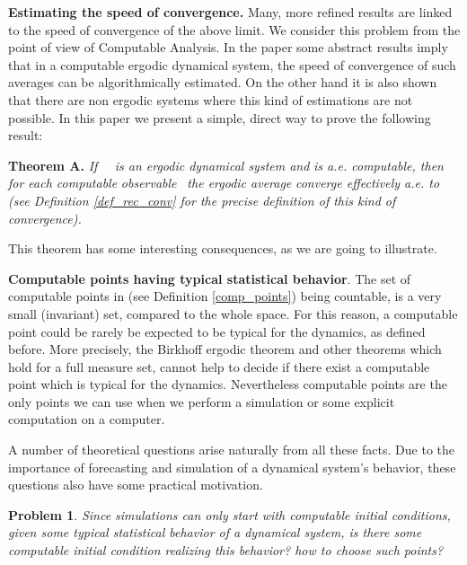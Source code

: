\documentclass[copyright,creativecommons]{eptcs}
\newtheorem{problem}{Problem}
\numberwithin{equation}{section}
\begin{document}
\noindent \textbf{Estimating the speed of convergence. }Many, more refined
results are linked to the speed of convergence of the above limit. We
consider this problem from the point of view of Computable Analysis. In the
paper \cite{AvigadGT10} some abstract results imply that in a computable
ergodic dynamical system, the speed of convergence of such averages can be
algorithmically estimated. On the other hand it is also shown that there are
non ergodic systems where this kind of estimations are not possible. In this
paper we present a simple, direct way to prove the following result:

\smallskip

\noindent \textbf{Theorem A. } \emph{If \ }\emph{\ is an ergodic
dynamical system and } \emph{is a.e. computable, then for each computable } \emph{observable }\emph{\ the ergodic average } \emph{converge effectively a.e. to } \emph{(see Definition \ref{def_rec_conv} for the precise
definition of this kind of convergence).} \newline

This theorem has some interesting consequences, as we are going to
illustrate.

\smallskip

\noindent \textbf{Computable points having typical statistical behavior}.
The set of computable points in  (see Definition \ref{comp_points}) being
countable, is a very small (invariant) set, compared to the whole space. For
this reason, a computable point could be rarely be expected to be typical
for the dynamics, as defined before. More precisely, the Birkhoff ergodic
theorem and other theorems which hold for a full measure set, cannot help to
decide if there exist a computable point which is typical for the dynamics.
Nevertheless computable points are the only points we can use when we
perform a simulation or some explicit computation on a computer.

A number of theoretical questions arise naturally from all these facts. Due
to the importance of forecasting and simulation of a dynamical system's
behavior, these questions also have some practical motivation.

\begin{problem}
Since simulations can only start with computable initial conditions, given
some typical statistical behavior of a dynamical system, is there some
computable initial condition realizing this behavior? how to choose such
points?
\end{problem}
\end{document}
